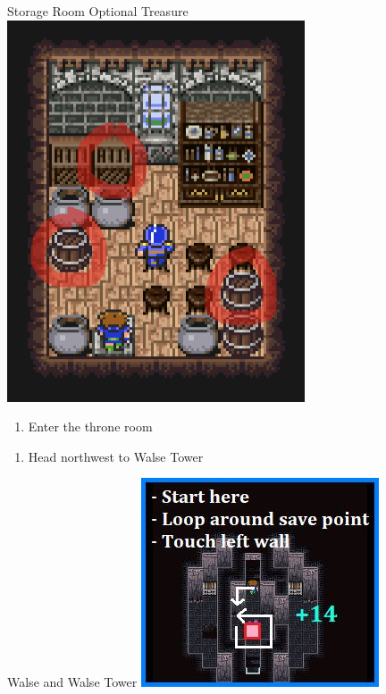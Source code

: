 \begin{paracol}{2}
\switchcolumn
\begin{misc}{Storage Room Optional Treasure}
    \includegraphics[scale=.399]{../Graphics/Misc/4. Walse Castle Optional Pickups.png}
\end{misc}

\switchcolumn
\resume
\begin{enumerate}[resume]
    \item Enter the throne room
\end{enumerate}

\switchcolumnTwice[*]
\resume
\begin{enumerate}[resume]
    \item Head northwest to Walse Tower
\end{enumerate}

\switchcolumn
\begin{steproute}{Walse and Walse Tower}
    \includegraphics[scale=0.452]{../Graphics/Steps/31. Walse Tower 1.jpg}
\end{steproute}


\end{paracol}
